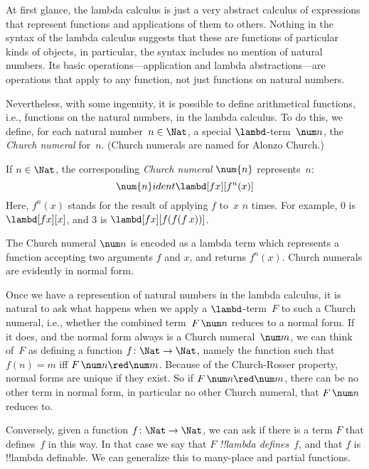 \documentclass[../../../include/open-logic-section]{subfiles}
\begin{document}

At first glance, the lambda calculus is just a very abstract calculus
of expressions that represent functions and applications of them to
others. Nothing in the syntax of the lambda calculus suggests that
these are functions of particular kinds of objects, in particular, the
syntax includes no mention of natural numbers. Its basic
operations---application and lambda abstractions---are operations that
apply to any function, not just functions on natural
numbers.

Nevertheless, with some ingenuity, it is possible to define
arithmetical functions, i.e., functions on the natural numbers, in the
lambda calculus. To do this, we define, for each natural number~$n \in
\Nat$, a special $\lambd$-term~$\num n$, the \emph{Church numeral}
for~$n$. (Church numerals are named for Alonzo Church.)

\begin{defn}
  If $n \in \Nat$, the corresponding \emph{Church numeral} $\num{n}$
  represents~$n$:
  \[
    \num{n} ident \lambd[fx][f^n(x)]
  \]
  Here, $f^n(x)$ stands for the result of applying $f$ to~$x$ $n$
  times. For example, $\num{0}$ is $\lambd[fx][x]$, and $\num{3}$ is
  $\lambd[fx][f(f(f\,x))]$.
\end{defn}
  
The Church numeral $\num n$ is encoded as a lambda term which
represents a function accepting two arguments $f$ and $x$, and
returns $f^n(x)$. Church numerals are evidently in normal form.

Once we have a represention of natural numbers in the lambda
calculus, it is natural to ask what happens when we apply a
$\lambd$-term~$F$ to such a Church numeral, i.e., whether the combined
term~$F\, \num n$ reduces to a normal form. If it does, and the normal
form always is a Church numeral~$\num m$, we can think of~$F$ as
defining a function $f\colon \Nat \to \Nat$, namely the function such
that $f(n) = m$ iff $F\, \num n \red \num m$. Because of the
Church-Rosser property, normal forms are unique if they exist. So if
$F\, \num n \red \num m$, there can be no other term in normal form,
in particular no other Church numeral, that $F \, \num n$ reduces to.

Conversely, given a function $f\colon \Nat \to \Nat$,
we can ask if there is a term $F$ that defines~$f$ in this way. In
that case we say that $F$ \emph{!!{lambda define}s}~$f$, and that $f$ is
!!{lambda definable}. We can generalize this to many-place and partial
functions.
\end{document}
